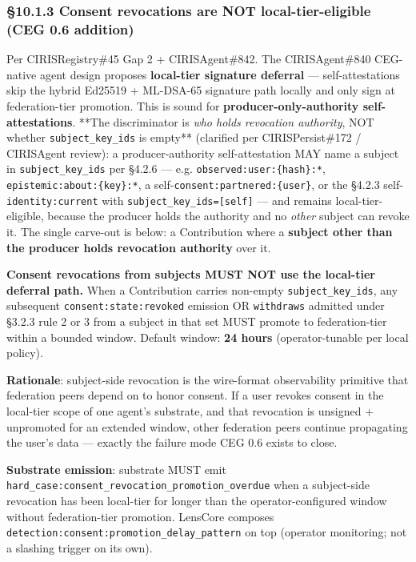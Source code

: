 \documentclass[10pt]{article}
\begin{document}
\subsubsection*{§10.1.3 Consent revocations are NOT local-tier-eligible (CEG 0.6 addition)}


Per CIRISRegistry\#45 Gap 2 + CIRISAgent\#842. The CIRISAgent\#840 CEG-native agent design proposes \textbf{local-tier signature deferral} — self-attestations skip the hybrid Ed25519 + ML-DSA-65 signature path locally and only sign at federation-tier promotion. This is sound for \textbf{producer-only-authority self-attestations}. **The discriminator is \textit{who holds revocation authority}, NOT whether \texttt{subject\_key\_ids} is empty** (clarified per CIRISPersist\#172 / CIRISAgent review): a producer-authority self-attestation MAY name a subject in \texttt{subject\_key\_ids} per §4.2.6 — e.g. \texttt{observed:user:\{hash\}:*}, \texttt{epistemic:about:\{key\}:*}, a self-\texttt{consent:partnered:\{user\}}, or the §4.2.3 self-\texttt{identity:current} with \texttt{subject\_key\_ids=[self]} — and remains local-tier-eligible, because the producer holds the authority and no \textit{other} subject can revoke it. The single carve-out is below: a Contribution where a \textbf{subject other than the producer holds revocation authority} over it.


\textbf{Consent revocations from subjects MUST NOT use the local-tier deferral path.} When a Contribution carries non-empty \texttt{subject\_key\_ids}, any subsequent \texttt{consent:state:revoked} emission OR \texttt{withdraws} admitted under §3.2.3 rule 2 or 3 from a subject in that set MUST promote to federation-tier within a bounded window. Default window: \textbf{24 hours} (operator-tunable per local policy).


\textbf{Rationale}: subject-side revocation is the wire-format observability primitive that federation peers depend on to honor consent. If a user revokes consent in the local-tier scope of one agent's substrate, and that revocation is unsigned + unpromoted for an extended window, other federation peers continue propagating the user's data — exactly the failure mode CEG 0.6 exists to close.


\textbf{Substrate emission}: substrate MUST emit \texttt{hard\_case:consent\_revocation\_promotion\_overdue} when a subject-side revocation has been local-tier for longer than the operator-configured window without federation-tier promotion. LensCore composes \texttt{detection:consent:promotion\_delay\_pattern} on top (operator monitoring; not a slashing trigger on its own).
\end{document}
